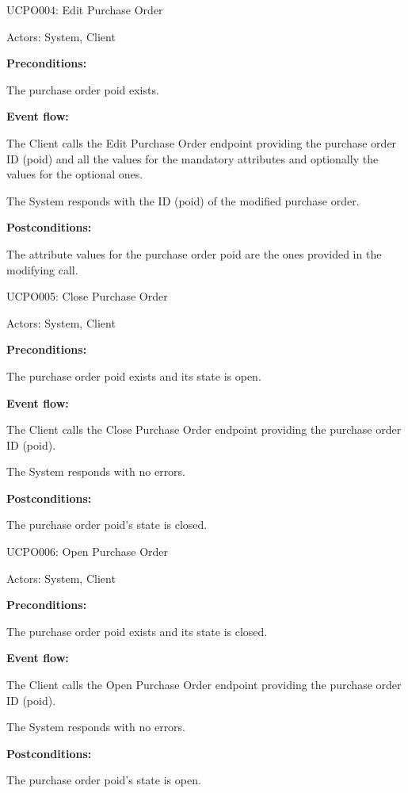\begin{ucbox}{UCPO004: Edit Purchase Order}
\label{UCPO004}

Actors: System, Client

\textbf{Preconditions:}

\ucitem The purchase order poid exists.

\textbf{Event flow:}

\ucitem The Client calls the Edit Purchase Order endpoint providing the purchase order ID (poid) and all the values for the mandatory attributes and optionally the values for the 
optional ones.

\ucitem The System responds with the ID (poid) of the modified purchase order.

\textbf{Postconditions:}

\ucitem The attribute values for the purchase order poid are the ones provided in the modifying call.

\end{ucbox}

\begin{ucbox}{UCPO005: Close Purchase Order}
\label{UCPO005}

Actors: System, Client

\textbf{Preconditions:}

\ucitem The purchase order poid exists and its state is open.

\textbf{Event flow:}

\ucitem The Client calls the Close Purchase Order endpoint providing the purchase order ID (poid).

\ucitem The System responds with no errors.

\textbf{Postconditions:}

\ucitem The purchase order poid’s state is closed.

\end{ucbox}

\begin{ucbox}{UCPO006: Open Purchase Order}
\label{UCPO006}

Actors: System, Client

\textbf{Preconditions:}

\ucitem The purchase order poid exists and its state is closed.

\textbf{Event flow:}

\ucitem The Client calls the Open Purchase Order endpoint providing the purchase order ID (poid).

\ucitem The System responds with no errors.

\textbf{Postconditions:}

\ucitem The purchase order poid’s state is open.

\end{ucbox}


